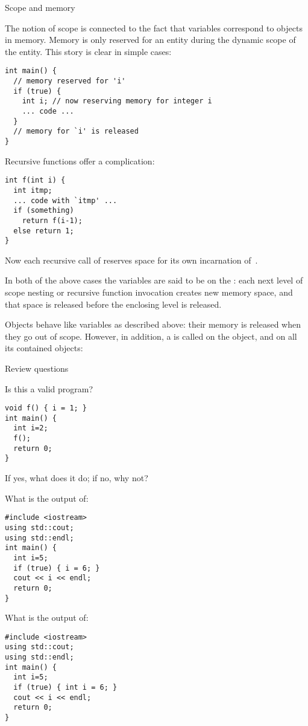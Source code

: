  {Scope and memory}

The notion of scope is connected to the fact that variables correspond
to objects in memory. Memory is only reserved for an entity during the
dynamic scope of the entity. This story is clear in simple cases:
\begin{lstlisting}
int main() {
  // memory reserved for 'i'
  if (true) {
    int i; // now reserving memory for integer i
    ... code ...
  }
  // memory for `i' is released
}
\end{lstlisting}
Recursive functions offer a complication:
\begin{lstlisting}
int f(int i) {
  int itmp;
  ... code with `itmp' ...
  if (something)
    return f(i-1);
  else return 1;
}
\end{lstlisting}
Now each recursive call of  reserves space for its own
incarnation of~.

In both of the above cases the variables are said to be on the
: each next level of scope nesting or recursive
function invocation creates new memory space, and that space is
released before the enclosing level is released.

Objects behave like variables as described above: their memory is
released when they go out of scope. However, in addition, a
 is called on the object, and on all its
contained objects:
%

 {Review questions}

\begin{exercise}
  \label{ex:cpp-scope1}
  Is this a valid program?
\begin{lstlisting}
void f() { i = 1; }
int main() {
  int i=2;
  f();
  return 0;
}
\end{lstlisting}
If yes, what does it do; if no, why not?
\end{exercise}

\begin{exercise}
  \label{ex:cpp-scope2}
  What is the output of:
\begin{lstlisting}
#include <iostream>
using std::cout;
using std::endl;
int main() {
  int i=5;
  if (true) { i = 6; }
  cout << i << endl;
  return 0;
}
\end{lstlisting}
\end{exercise}

\begin{exercise}
  \label{ex:cpp-scope3}
  What is the output of:
\begin{lstlisting}
#include <iostream>
using std::cout;
using std::endl;
int main() {
  int i=5;
  if (true) { int i = 6; }
  cout << i << endl;
  return 0;
}
\end{lstlisting}
\end{exercise}

